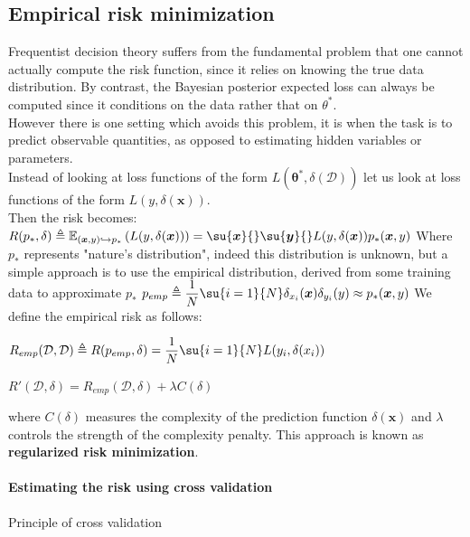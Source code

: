 \subsection{Empirical risk minimization}
Frequentist decision theory suffers from the fundamental problem that one cannot actually
compute the risk function, since it relies on knowing the true data distribution. By
contrast, the Bayesian posterior expected loss can always be computed since it conditions
on the data rather that on $\theta^{*}$.\\
However there is one setting which avoids this problem, it is when the task is to predict
observable quantities, as opposed to estimating hidden variables or parameters.\\
Instead of looking at loss functions of the form $L(\bm{\theta^{*}}, \delta(\mathcal{D}))$
let us look at loss functions of the form $L(y, \delta(\bm{x}))$.\\
Then the risk becomes:
$R(p_{*}, \delta) \triangleq \mathbb{E}_{(\bm{x}, y)\hookrightarrow p_{*}}\left(L(y,
\delta(\bm{x}))\right) = \su{\bm{x}}{}\su{\bm{y}}{}L(y, \delta(\bm{x}))p_{*}(\bm{x}, y)$
Where $p_{*}$ represents "nature's distribution", indeed this distribution is unknown, 
but a simple approach is to use the empirical distribution, derived from some training 
data to approximate $p_{*}$
$p_{emp} \triangleq \dfrac{1}{N}\su{i=1}{N}\delta_{x_{i}}(\bm{x})\delta_{y_{i}}(y) 
\approx p_{*}(\bm{x}, y)$
We define the empirical risk as follows:
\begin{center}
    $R_{emp}(\mathcal{D}, \mathcal{D}) \triangleq R(p_{emp}, \delta) = \dfrac{1}{N}
    \su{i=1}{N}L(y_{i}, \delta(x_{i}))$
\end{center}
\begin{center}
    $R'(\mathcal{D}, \delta) = R_{emp}(\mathcal{D}, \delta) + \lambda C(\delta)$
\end{center}
where $C(\delta)$ measures the complexity of the prediction function $\delta(\bm{x})$ and 
$\lambda$ controls the strength of the complexity penalty. 
This approach is known as \textbf{regularized risk minimization}.

\paragraph{Estimating the risk using cross validation}
Principle of cross validation













